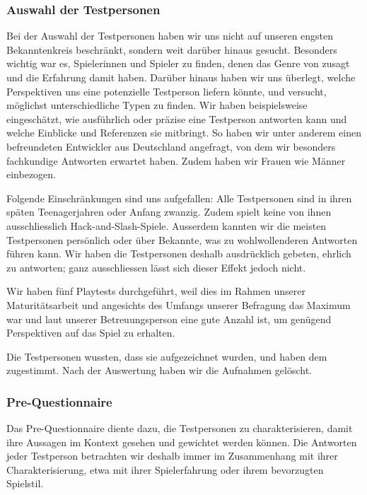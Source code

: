 \documentclass[../Main.tex]{subfiles}
\begin{document}
\subsubsection{Auswahl der Testpersonen} \label{sec:AuswahlTP}
Bei der Auswahl der Testpersonen haben wir uns nicht auf unseren engsten Bekanntenkreis beschränkt, sondern weit darüber hinaus gesucht. Besonders wichtig war es, Spielerinnen und Spieler zu finden, denen das Genre von  zusagt und die Erfahrung damit haben. Darüber hinaus haben wir uns überlegt, welche Perspektiven uns eine potenzielle Testperson liefern könnte, und versucht, möglichst unterschiedliche Typen zu finden. Wir haben beispielsweise eingeschätzt, wie ausführlich oder präzise eine Testperson antworten kann und welche Einblicke und Referenzen sie mitbringt. So haben wir unter anderem einen befreundeten Entwickler aus Deutschland angefragt, von dem wir besonders fachkundige Antworten erwartet haben. Zudem haben wir Frauen wie Männer einbezogen.

Folgende Einschränkungen sind uns aufgefallen: Alle Testpersonen sind in ihren späten Teenagerjahren oder Anfang zwanzig. Zudem spielt keine von ihnen ausschliesslich Hack-and-Slash-Spiele. Ausserdem kannten wir die meisten Testpersonen persönlich oder über Bekannte, was zu wohlwollenderen Antworten führen kann. Wir haben die Testpersonen deshalb ausdrücklich gebeten, ehrlich zu antworten; ganz ausschliessen lässt sich dieser Effekt jedoch nicht.

Wir haben fünf Playtests durchgeführt, weil dies im Rahmen unserer Maturitätsarbeit und angesichts des Umfangs unserer Befragung das Maximum war und laut unserer Betreuungsperson eine gute Anzahl ist, um genügend Perspektiven auf das Spiel zu erhalten.

Die Testpersonen wussten, dass sie aufgezeichnet wurden, und haben dem zugestimmt. Nach der Auswertung haben wir die Aufnahmen gelöscht.

\subsubsection{Pre-Questionnaire} \label{sec:PreQuestionnaire}

Das Pre-Questionnaire diente dazu, die Testpersonen zu charakterisieren, damit ihre Aussagen im Kontext gesehen und gewichtet werden können. Die Antworten jeder Testperson betrachten wir deshalb immer im Zusammenhang mit ihrer Charakterisierung, etwa mit ihrer Spielerfahrung oder ihrem bevorzugten Spielstil.
\end{document}
